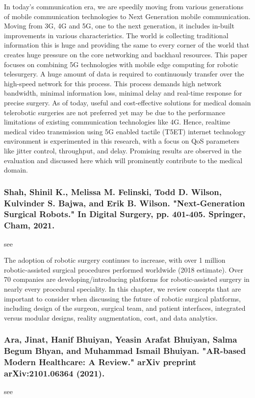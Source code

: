 \documentclass[conference]{IEEEtran}
\begin{document}
In today’s communication era, we are speedily moving from various generations of mobile communication technologies to Next Generation mobile communication. Moving from 3G, 4G and 5G, one to the next generation, it includes in-built improvements in various characteristics. The world is collecting traditional information this is huge and providing the same to every corner of the world that creates huge pressure on the core networking and backhaul resources. This paper focuses on combining 5G technologies with mobile edge computing for robotic telesurgery. A huge amount of data is required to continuously transfer over the high-speed network for this process. This process demands high network bandwidth, minimal information loss, minimal delay and real-time response for precise surgery. As of today, useful and cost-effective solutions for medical domain telerobotic surgeries are not preferred yet may be due to the performance limitations of existing communication technologies like 4G. Hence, realtime medical video transmission using 5G enabled tactile (T5ET) internet technology environment is experimented in this research, with a focus on QoS parameters like jitter control, throughput, and delay. Promising results are observed in the evaluation and discussed here which will prominently contribute to the medical domain.

\medskip
\subsubsection{Shah, Shinil K., Melissa M. Felinski, Todd D. Wilson, Kulvinder S. Bajwa, and Erik B. Wilson. "Next-Generation Surgical Robots." In Digital Surgery, pp. 401-405. Springer, Cham, 2021.}
see \cite{shah2021next}

The adoption of robotic surgery continues to increase, with over 1 million robotic-assisted surgical procedures performed worldwide (2018 estimate). Over 70 companies are developing/introducing platforms for robotic-assisted surgery in nearly every procedural speciality. In this chapter, we review concepts that are important to consider when discussing the future of robotic surgical platforms, including design of the surgeon, surgical team, and patient interfaces, integrated versus modular designs, reality augmentation, cost, and data analytics.

\medskip
\subsubsection{Ara, Jinat, Hanif Bhuiyan, Yeasin Arafat Bhuiyan, Salma Begum Bhyan, and Muhammad Ismail Bhuiyan. "AR-based Modern Healthcare: A Review." arXiv preprint arXiv:2101.06364 (2021).}
see \cite{ara2021ar}
\end{document}
